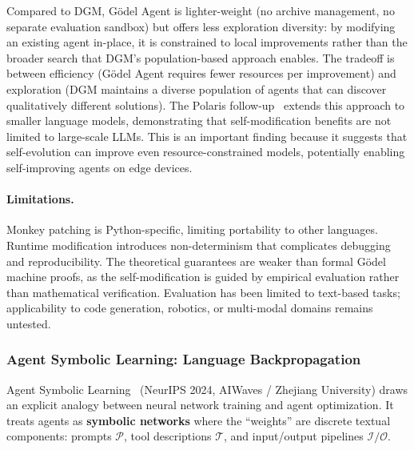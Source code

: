 Compared to DGM, G\"{o}del Agent is lighter-weight (no archive management, no separate evaluation sandbox) but offers less exploration diversity: by modifying an existing agent in-place, it is constrained to local improvements rather than the broader search that DGM's population-based approach enables. The tradeoff is between efficiency (G\"{o}del Agent requires fewer resources per improvement) and exploration (DGM maintains a diverse population of agents that can discover qualitatively different solutions). The Polaris follow-up~\citep{ye2025polaris} extends this approach to smaller language models, demonstrating that self-modification benefits are not limited to large-scale LLMs. This is an important finding because it suggests that self-evolution can improve even resource-constrained models, potentially enabling self-improving agents on edge devices.

\paragraph{Limitations.}
Monkey patching is Python-specific, limiting portability to other languages. Runtime modification introduces non-determinism that complicates debugging and reproducibility. The theoretical guarantees are weaker than formal G\"{o}del machine proofs, as the self-modification is guided by empirical evaluation rather than mathematical verification. Evaluation has been limited to text-based tasks; applicability to code generation, robotics, or multi-modal domains remains untested.


\subsubsection{Agent Symbolic Learning: Language Backpropagation}

Agent Symbolic Learning~\citep{agentsymboliclearning2024} (NeurIPS 2024, AIWaves / Zhejiang University) draws an explicit analogy between neural network training and agent optimization. It treats agents as \textbf{symbolic networks} where the ``weights'' are discrete textual components: prompts $\mathcal{P}$, tool descriptions $\mathcal{T}$, and input/output pipelines $\mathcal{I}/\mathcal{O}$.

